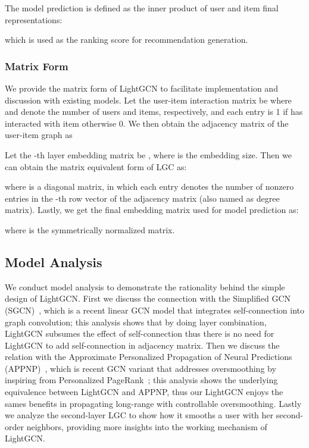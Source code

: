 \documentclass[sigconf]{acmart}
\theoremstyle{definition}
\begin{document}
The model prediction is defined as the inner product of user and item final representations: 

which is used as the ranking score for recommendation generation. 

\subsubsection{Matrix Form} We provide the matrix form of LightGCN to facilitate implementation and discussion with existing models. Let the user-item interaction matrix be  where  and  denote the number of users and items, respectively, and each entry  is 1 if  has interacted with item  otherwise 0. We then obtain the adjacency matrix of the user-item graph as 

Let the -th layer embedding matrix be , where  is the embedding size.  
Then we can obtain the matrix equivalent form of LGC as:

where  is a  diagonal matrix, in which each entry  denotes the number of nonzero entries in the -th row vector of the  adjacency matrix  (also named as degree matrix). Lastly, we get the final embedding matrix used for model prediction as:

where  is the symmetrically normalized matrix.

\subsection{Model Analysis}
We conduct model analysis to demonstrate the rationality behind the simple design of LightGCN. 
First we discuss the connection with the Simplified GCN (SGCN)~\cite{SGCN}, which is a recent linear GCN model that integrates self-connection into graph convolution; this analysis shows that by doing layer combination, LightGCN subsumes the effect of self-connection thus there is no need for LightGCN to add self-connection in adjacency matrix. 
Then we discuss the relation with the Approximate Personalized Propagation of Neural Predictions (APPNP)~\cite{ICLR19-APPNP}, which is recent GCN variant that addresses oversmoothing by inspiring from Personalized PageRank~\cite{haveliwala2002topic}; this analysis shows the underlying equivalence between LightGCN and APPNP, thus our LightGCN enjoys the sames benefits in propagating long-range with controllable oversmoothing. 
Lastly we analyze the second-layer LGC to show how it smooths a user with her second-order neighbors, providing more insights into the working mechanism of LightGCN.  
\end{document}
